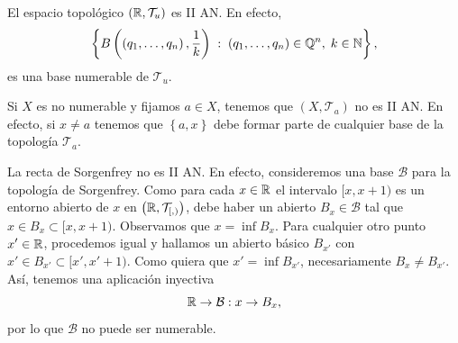 \begin{eg}
El espacio topológico $\displaystyle \left(\mathbb{R}, \mathcal{T}_{u}\right) $ es II AN. En efecto, 
\[ \left\{ B\left(\left(q_{1}, \ldots, q_{n}\right), \frac{1}{k}\right) \; : \; \left(q_{1}, \ldots, q_{n}\right)\in \mathbb{Q}^{n}, \; k \in \mathbb{N}\right\}  ,\]
es una base numerable de $\displaystyle \mathcal{T}_{u} $. 
\end{eg}
\begin{eg}
	Si $\displaystyle X $ es no numerable y fijamos $\displaystyle a \in X $, tenemos que $\displaystyle \left(X, \mathcal{T}_{a}\right) $ no es II AN. En efecto, si $\displaystyle x \neq a $ tenemos que $\displaystyle \left\{ a,x\right\}  $ debe formar parte de cualquier base de la topología $\displaystyle \mathcal{T}_{a} $.
\end{eg}
\begin{eg}
La recta de Sorgenfrey no es II AN. En efecto, consideremos una base $\displaystyle \mathcal{B} $ para la topología de Sorgenfrey. Como para cada $\displaystyle x\in \mathbb{R} $ el intervalo $\displaystyle [x, x + 1) $ es un entorno abierto de $\displaystyle x $ en $\displaystyle \left(\mathbb{R}, \mathcal{T}_{[,)}\right) $, debe haber un abierto $\displaystyle B_{x}\in \mathcal{B} $ tal que $\displaystyle x \in B_{x}\subset[x,x +1) $. Observamos que $\displaystyle x = \inf B_{x} $. Para cualquier otro punto $\displaystyle x' \in \mathbb{R} $, procedemos igual y hallamos un abierto básico $\displaystyle B_{x'} $ con $\displaystyle x ' \in B_{x'}\subset [x',x'+1 )$. Como quiera que $\displaystyle x' = \inf B_{x'} $, necesariamente $\displaystyle B_{x} \neq B_{x'} $. Así, tenemos una aplicación inyectiva
\[ \mathbb{R} \to \mathcal{B} : x \to B_{x} ,\]
por lo que $\displaystyle \mathcal{B} $ no puede ser numerable. 
\end{eg}
